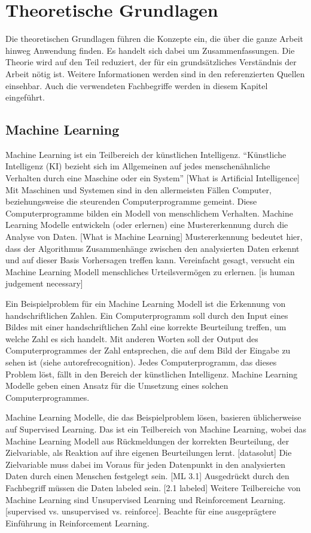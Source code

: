 \chapter{Theoretische Grundlagen}
\label{chap:t}
Die theoretischen Grundlagen führen die Konzepte ein, die über die ganze Arbeit
hinweg Anwendung finden. Es handelt sich dabei um Zusammenfassungen. Die Theorie
wird auf den Teil reduziert, der für ein grundsätzliches Verständnis der Arbeit
nötig ist. Weitere Informationen werden sind in den referenzierten Quellen
einsehbar. Auch die verwendeten Fachbegriffe werden in diesem Kapitel
eingeführt. 

\section{Machine Learning}
\label{chap:t_ml}
Machine Learning ist ein Teilbereich der künstlichen Intelligenz. ``Künstliche
Intelligenz (KI) bezieht sich im Allgemeinen auf jedes menschenähnliche
Verhalten durch eine Maschine oder ein System'' [What is Artificial Intelligence] Mit Maschinen und                
Systemen sind in den allermeisten Fällen Computer, beziehungsweise die
steurenden Computerprogramme gemeint. Diese Computerprogramme bilden ein Modell
von menschlichem Verhalten. Machine Learning Modelle entwickeln (oder erlernen)
eine Mustererkennung durch die Analyse von Daten. [What is Machine Learning]
Mustererkennung bedeutet hier, dass der Algorithmus Zusammenhänge zwischen den
analysierten Daten erkennt und auf dieser Basis Vorhersagen treffen kann.
Vereinfacht gesagt, versucht ein Machine Learning Modell menschliches
Urteilsvermögen zu erlernen. [is human judgement necessary]

Ein Beispielproblem für ein Machine Learning Modell ist die Erkennung von
handschriftlichen Zahlen. Ein Computerprogramm soll durch den Input eines Bildes
mit einer handschriftlichen Zahl eine korrekte Beurteilung treffen, um welche
Zahl es sich handelt. Mit anderen Worten soll der Output des Computerprogrammes
der Zahl entsprechen, die auf dem Bild der Eingabe zu sehen ist (siehe autoref{recognition}). Jedes
Computerprogramm, das dieses Problem löst, fällt in den Bereich der künstlichen
Intelligenz. Machine Learning Modelle geben einen Ansatz für die Umsetzung eines
solchen Computerprogrammes.


Machine Learning Modelle, die das Beispielproblem lösen, basieren üblicherweise 
auf Supervised Learning. Das ist ein Teilbereich von Machine Learning, wobei das
Machine Learning Modell aus Rückmeldungen der korrekten Beurteilung, der
Zielvariable, als Reaktion auf ihre eigenen Beurteilungen lernt. [datasolut] Die
Zielvariable muss dabei im Voraus für jeden Datenpunkt in den analysierten Daten
durch einen Menschen festgelegt sein. [ML 3.1] Ausgedrückt durch den Fachbegriff müssen die
Daten labeled sein. [2.1 labeled] Weitere Teilbereiche von Machine Learning sind
Unsupervised Learning und Reinforcement Learning. [supervised vs. unsupervised
vs. reinforce]. Beachte  für eine ausgeprägtere Einführung
in Reinforcement Learning.

